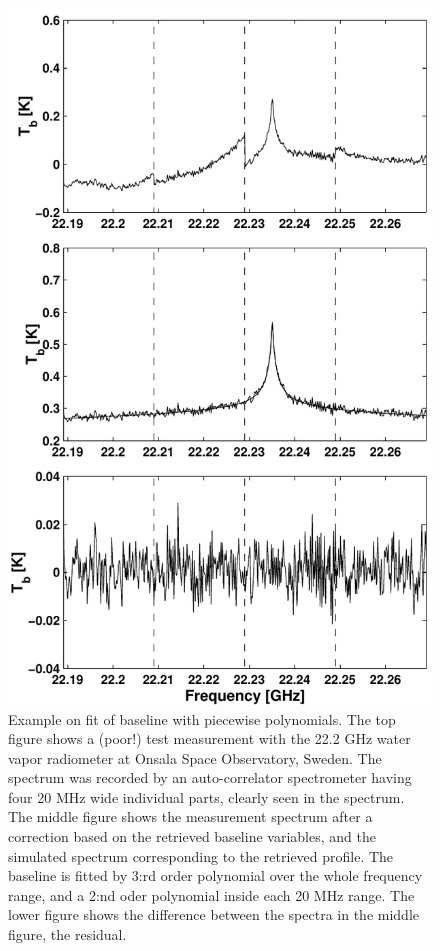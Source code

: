  \begin{figure}[t]
  \begin{center}
   \includegraphics*[width=0.72\hsize]{Figs/fig_baselinefit}
   \caption{Example on fit of baseline with piecewise polynomials.
     The top figure shows a (poor!) test measurement with the 22.2 GHz
     water vapor radiometer at Onsala Space Observatory, Sweden.  The
     spectrum was recorded by an auto-correlator spectrometer having
     four 20 MHz wide individual parts, clearly seen in the spectrum.
     The middle figure shows the measurement spectrum after a
     correction based on the retrieved baseline variables, and the
     simulated spectrum corresponding to the retrieved profile. The
     baseline is fitted by 3:rd order polynomial over the whole
     frequency range, and a 2:nd oder polynomial inside each 20 MHz
     range. The lower figure shows the difference between the spectra
     in the middle figure, the residual.}
   \label{fig:wfuns:baselinefit}
  \end{center}
 \end{figure}




